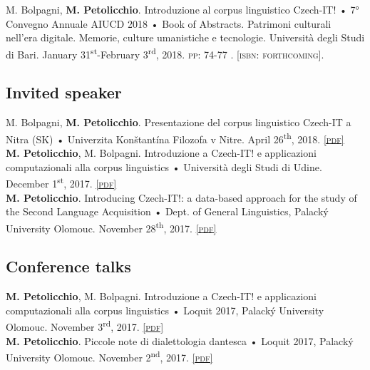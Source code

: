 \documentclass[9pt, a4paper]{article}
\newcommand{\pdf}[1]{\href{#1}{\scriptsize\textsc{[pdf]}}}
\newcommand{\isbn}[1]{{\scriptsize\textsc{[isbn: #1]}}}
\begin{document}
M. Bolpagni, \textbf{M. Petolicchio}. Introduzione al corpus linguistico Czech-IT! • 7° Convegno Annuale AIUCD 2018 • Book of Abstracts. Patrimoni culturali nell'era digitale. Memorie, culture umanistiche e tecnologie. Università degli Studi di Bari. January 31\textsuperscript{st}-February 3\textsuperscript{rd}, 2018. \textsc{pp:} 74-77 . \isbn{forthcoming}.





\subsection{Invited speaker}


M. Bolpagni, \textbf{M. Petolicchio}. Presentazione del corpus linguistico Czech-IT a Nitra (SK) •  Univerzita Konštantína Filozofa v Nitre. April 26\textsuperscript{th}, 2018. \pdf{https://www.researchgate.net/publication/327222171_Presentazione_del_corpus_linguistico_Czech-IT_a_Nitra_SK} \\

\textbf{M. Petolicchio}, M. Bolpagni. Introduzione a Czech-IT! e applicazioni computazionali alla corpus linguistics • Università degli Studi di Udine. December 1\textsuperscript{st}, 2017. \pdf{http://www.academia.edu/35315516/_UniUD_1_12_2017_Introduzione_a_Czech-IT_e_applicazioni_computazionali_alla_corpus_linguistics} \\

\textbf{M. Petolicchio}. Introducing Czech-IT!: a data-based approach for the study of the Second Language Acquisition • Dept. of General Linguistics, Palacký University Olomouc. November 28\textsuperscript{th}, 2017. \pdf{http://www.academia.edu/35278761/Introducing_Czech-IT_a_data-based_approach_for_the_study_of_the_Second_Language_Acquisition} 


\subsection{Conference talks}



\textbf{M. Petolicchio}, M. Bolpagni. Introduzione a Czech-IT! e applicazioni computazionali alla corpus linguistics • Loquit 2017, Palacký University Olomouc. November 3\textsuperscript{rd}, 2017. \pdf{http://www.academia.edu/35256167/Introduzione_a_Czech-IT_e_applicazioni_computazionali_alla_corpus_linguistics} \\

\textbf{M. Petolicchio}. Piccole note di dialettologia dantesca • Loquit 2017, Palacký University Olomouc. November 2\textsuperscript{nd}, 2017. \pdf{http://www.academia.edu/35256139/Piccole_note_di_dialettologia_dantesca} \\
\end{document}
